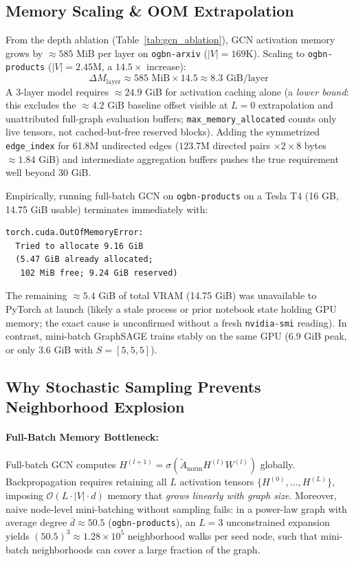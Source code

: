 \documentclass[10pt,twocolumn]{article}
\begin{document}
\subsection{Memory Scaling \& OOM Extrapolation}
From the depth ablation (Table~\ref{tab:gcn_ablation}), GCN activation memory
grows by ${\approx}585$ MiB per layer on \texttt{ogbn-arxiv} ($|V|{=}169$K).
Scaling to \texttt{ogbn-products} ($|V|{=}2.45$M, a $14.5{\times}$ increase):
\begin{equation}
  \Delta M_{\text{layer}} \approx 585\text{ MiB} \times 14.5 \approx 8.3\text{ GiB/layer}
\end{equation}
A 3-layer model requires $\approx 24.9$ GiB for activation caching alone (a
\emph{lower bound}: this excludes the ${\approx}4.2$ GiB baseline offset visible
at $L{=}0$ extrapolation and unattributed full-graph evaluation buffers;
\texttt{max\_memory\_allocated} counts only live tensors, not cached-but-free
reserved blocks).  Adding the symmetrized \texttt{edge\_index} for 61.8M
undirected edges ($123.7$M directed pairs $\times 2 \times 8$ bytes
$\approx 1.84$ GiB) and intermediate aggregation buffers pushes the true
requirement well beyond 30 GiB.

Empirically, running full-batch GCN on \texttt{ogbn-products} on a Tesla T4
(16 GB, 14.75 GiB usable) terminates immediately with:

\begin{verbatim}
torch.cuda.OutOfMemoryError:
  Tried to allocate 9.16 GiB
  (5.47 GiB already allocated;
   102 MiB free; 9.24 GiB reserved)
\end{verbatim}

The remaining $\approx5.4$ GiB of total VRAM (14.75 GiB) was unavailable to
PyTorch at launch (likely a stale process or prior notebook state holding GPU
memory; the exact cause is unconfirmed without a fresh \texttt{nvidia-smi}
reading). In contrast, mini-batch GraphSAGE trains stably on the same GPU
($6.9$ GiB peak, or only $3.6$ GiB with $S=[5,5,5]$).

\subsection{Why Stochastic Sampling Prevents Neighborhood Explosion}

\paragraph{Full-Batch Memory Bottleneck:}
Full-batch GCN computes $H^{(l+1)} = \sigma(\tilde{A}_{\text{norm}} H^{(l)} W^{(l)})$
globally. Backpropagation requires retaining all $L$ activation tensors
$\{H^{(0)},\ldots,H^{(L)}\}$, imposing $\mathcal{O}(L \cdot |V| \cdot d)$ memory
that \emph{grows linearly with graph size}.  Moreover, naive node-level
mini-batching without sampling fails: in a power-law graph with average degree
$\bar{d}\approx 50.5$ (\texttt{ogbn-products}), an $L=3$ unconstrained expansion
yields $(50.5)^3 \approx 1.28{\times}10^5$ neighborhood walks per seed node, such
that mini-batch neighborhoods can cover a large fraction of the graph.
\end{document}
